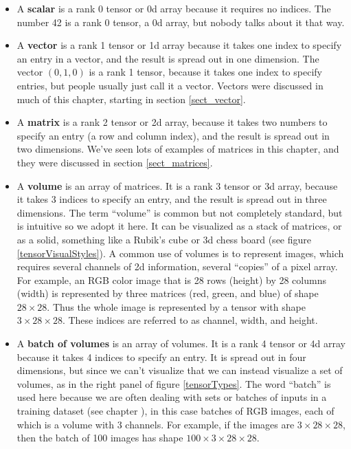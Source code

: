 \begin{itemize}
\item A \textbf{scalar} is a rank 0 tensor or 0d array because it requires no indices. The number 42 is a rank 0 tensor, a 0d array, but nobody talks about it that way. 
\item A \textbf{vector} is a rank 1 tensor or 1d array because it takes one index to specify an entry in a vector, and the result is spread out in one dimension. The vector $(0,1,0)$ is a rank 1 tensor, because it takes one index to specify entries, but people usually just call it a vector. Vectors were discussed in much of this chapter, starting in section \ref{sect_vector}.
\item A \textbf{matrix} is a rank 2 tensor or 2d array, because it takes two numbers to specify an entry (a row and column index), and the result is spread out in two dimensions. We've seen lots of examples of matrices in this chapter, and they were discussed in section \ref{sect_matrices}.
\item A \textbf{volume} is an array of matrices. It is a rank 3 tensor or 3d array, because it takes 3 indices to specify an entry, and the result is spread out in three dimensions. The term ``volume'' is common but not completely standard, but is intuitive so we adopt it here. It can be visualized as a stack of matrices, or as a solid, something like a Rubik's cube or 3d chess board (see figure \ref{tensorVisualStyles}). A common use of volumes is to represent images, which requires several channels of 2d information, several ``copies'' of a pixel array. For example, an RGB color image that is 28 rows (height) by 28 columns (width) is represented by three matrices (red, green, and blue) of shape $28 \times 28$. Thus the whole image is represented by a tensor with shape $3 \times 28 \times 28$.  These indices are referred to as channel, width, and height. 
\item A \textbf{batch of volumes} is an array of volumes. It is a rank 4 tensor or 4d array because it takes 4 indices to specify an entry. It is spread out in four dimensions, but since we can't visualize that we can instead visualize a set of volumes, as in the right panel of figure \ref{tensorTypes}. The word ``batch'' is used here because we are often dealing with sets or batches of inputs in a training dataset (see chapter ), in this case batches of RGB images, each of which is a volume with 3 channels. For example, if the images are $3 \times 28 \times 28$, then the batch of 100 images has shape $100 \times 3 \times 28 \times 28$. 
\end{itemize}

